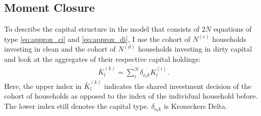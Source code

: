 \subsection{Moment Closure}
\label{moment_closure}

To describe the capital structure in the model that consists of $2N$ equations of type \eqref{eq:approx_ci} and \eqref{eq:approx_di}, I use the cohort of $N^{(c)}$ households investing in clean and the cohort of $N^{(d)}$ households investing in dirty capital and look at the aggregates of their respective capital holdings:
\begin{align}
  \bar{K}_l^{(k)} = \sum_{i}^{N} \delta_{o_ik} K_l^{(i)}.%
	\label{eq:moments_definition}
\end{align}
Here, the upper index in $\bar{K}_l^{(k)}$ indicates the shared investment decision of the cohort of households as opposed to the index of the individual household before. The lower index still denotes the capital type. $\delta_{o_ik}$ is Kroneckers Delta.

